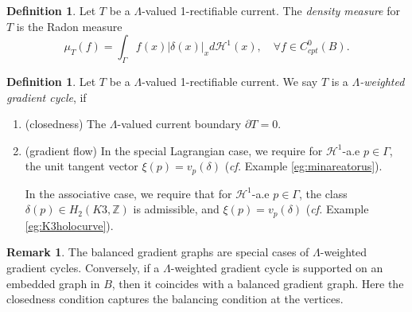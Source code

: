 \documentclass{article}
\theoremstyle{definition}
\newtheorem{rmk}{Remark}
\newtheorem{Def}[thm]{Definition}
\newcommand{\cf}{\emph{cf.} }
\newcommand{\R}{\mathbb{R}}
\newcommand{\Z}{\mathbb{Z}}
\begin{document}
\begin{Def}\label{Def:gradientcycle}
Let $T$ be a $\Lambda$-valued 1-rectifiable current. %
The \emph{density measure} for $T$ is the Radon measure 
\[
\mu_T (f)= \int_\Gamma f(x) |\delta(x)|_x d\mathcal{H}^1 (x),\quad \forall f\in C^0_{cpt}(B).
\]

\end{Def}
		
		
		
		
		
		
		
		\begin{Def}\label{Def:densitymeasure}
	Let $T$ be a  $\Lambda$-valued 1-rectifiable current. We say $T$ is a \emph{$\Lambda$-weighted gradient cycle}, if 
	\begin{enumerate}
		\item  (closedness)  The $\Lambda$-valued current boundary $\partial T=0$.
		\item (gradient flow)  In the special Lagrangian case, we require for $\mathcal{H}^1$-a.e $p\in \Gamma$, the unit tangent vector $\xi(p)  =v_p(\delta)$ (\cf Example \ref{eg:minareatorus}).
		
		
		
		
		 In the associative case, we require that for $\mathcal{H}^1$-a.e $p\in \Gamma$, the class $\delta(p)\in H_2(K3,\Z)$ is admissible, and $\xi(p)= v_p(\delta)$
			(\cf Example \ref{eg:K3holocurve}).
		
		
	
		
		
		
		
	\end{enumerate}
		
		
			 
		\end{Def}
		
		
		\begin{rmk}
		The balanced gradient graphs are special cases of $\Lambda$-weighted gradient cycles. Conversely, if a  $\Lambda$-weighted gradient cycle is supported on an embedded graph in $B$, then it coincides with a balanced gradient graph.
		Here the closedness condition captures the balancing condition at the vertices. 
		\end{rmk}
		
\end{document}
